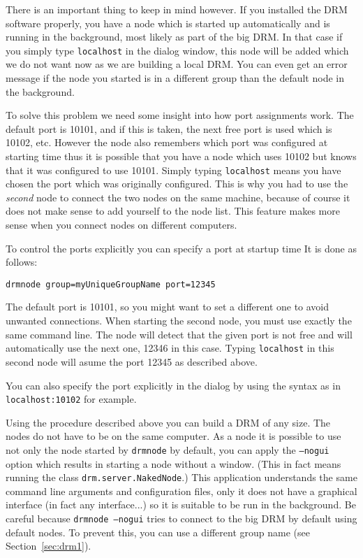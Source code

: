 \documentclass{article}
\begin{document}
There is an important thing to keep in mind however.
If you installed the DRM software properly, you have a node which is started
up automatically and is running in the background, most likely as part of
the big DRM.
In that case if you simply type {\tt localhost} in the dialog window, this
node will be added which we do not want now as we are building a local
DRM.
You can even get an error message if the node you started is in
a different group than the default node in the background.

To solve this problem we need some insight into how port assignments
work.
The default port is 10101, and if this is taken, the next free port is
used which is 10102, etc.
However the node also remembers which port was configured at starting time
thus it is possible that you have a node which uses 10102 but knows that
it was configured to use 10101.
Simply typing {\tt localhost} means you have chosen the port which was
originally configured.
This is why you had to use the {\em second} node to connect the two nodes
on the same machine, because of course it does not make sense to add yourself
to the node list.
This feature makes more sense when you connect nodes on different computers.

To control the ports explicitly you can specify a port at startup time
It is done as follows:
\begin{verbatim}
drmnode group=myUniqueGroupName port=12345
\end{verbatim}
The default port is 10101, so you might want to set a different one
to avoid unwanted connections.
When starting the second node, you must use exactly the same command line.
The node will detect that the given port is not free and will automatically
use the next one, 12346 in this case.
Typing {\tt localhost} in this second node will asume the port
12345 as described above.

You can also specify the port explicitly in the dialog by using the syntax
as in {\tt localhost:10102} for example.

Using the procedure described above you can build a DRM of any size.
The nodes do not have to be on the same computer.
As a node it is possible to use not only the node started by {\tt drmnode}
by default, you can apply the {\tt --nogui} option which
results in starting a node without a window.
(This in fact means running the class {\tt drm.server.NakedNode}.)
This application understands the same command line arguments and
configuration files, only it does not have a graphical interface (in fact any
interface...) so it is suitable to be run in the background.
Be careful because {\tt drmnode --nogui} tries to connect to the big
DRM by default using default nodes.
To prevent this, you can use a different group name
(see Section~\ref{sec:drm1}).
\end{document}
